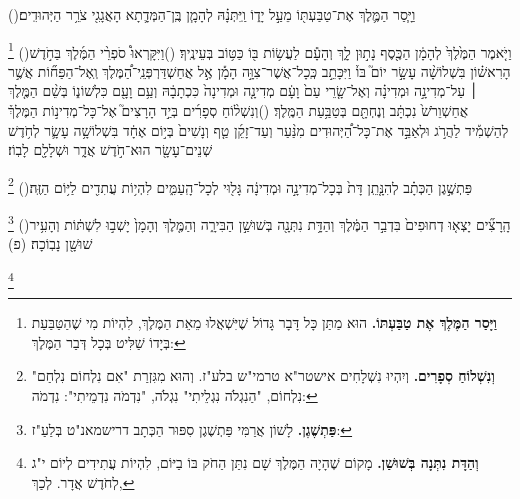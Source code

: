 \documentclass[12pt, openany]{book}
\newcommand{\footnotecomment}[1]{
	\renewcommand\thefootnote{}
	\footnote{\textsf{#1}}}
\newcommand{\commenta}[1]{\footnotecomment{#1}\hspace{0em}}
\newcommand{\vsnum}[1]{(\hebrewnumeral{#1})\space}
\begin{document}
\begin{multicols}{2}
\vsnum{10}וַיָּ֧סַר הַמֶּ֛לֶךְ אֶת־טַבַּעְתּ֖וֹ מֵעַ֣ל יָד֑וֹ וַֽיִּתְּנָ֗הּ לְהָמָ֧ן בֶּֽן־הַמְּדָ֛תָא הָאֲגָגִ֖י צֹרֵ֥ר הַיְּהוּדִֽים׃%
\commenta{\textrm{\textbf{וַיָּסַר הַמֶּלֶךְ אֶת טַבַּעְתּוֹ.}} הוּא מַתַּן כָּל דָּבָר גָּדוֹל שֶׁיִּשְׁאֲלוּ מֵאֵת הַמֶּלֶךְ, לִהְיוֹת מִי שֶׁהַטַּבַּעַת בְּיָדוֹ שַׁלִּיט בְּכָל דְּבַר הַמֶּלֶךְ: }%
\vsnum{11}וַיֹּ֤אמֶר הַמֶּ֙לֶךְ֙ לְהָמָ֔ן הַכֶּ֖סֶף נָת֣וּן לָ֑ךְ וְהָעָ֕ם לַעֲשׂ֥וֹת בּ֖וֹ כַּטּ֥וֹב בְּעֵינֶֽיךָ׃
\vsnum{12}וַיִּקָּרְאוּ֩ סֹפְרֵ֨י הַמֶּ֜לֶךְ בַּחֹ֣דֶשׁ הָרִאשׁ֗וֹן בִּשְׁלוֹשָׁ֨ה עָשָׂ֣ר יוֹם֮ בּוֹ֒ וַיִּכָּתֵ֣ב כְּֽכָל־אֲשֶׁר־צִוָּ֣ה הָמָ֡ן אֶ֣ל אֲחַשְׁדַּרְפְּנֵֽי־הַ֠מֶּלֶךְ וְֽאֶל־הַפַּח֞וֹת אֲשֶׁ֣ר ׀ עַל־מְדִינָ֣ה וּמְדִינָ֗ה וְאֶל־שָׂ֤רֵי עַם֙ וָעָ֔ם מְדִינָ֤ה וּמְדִינָה֙ כִּכְתָבָ֔הּ וְעַ֥ם וָעָ֖ם כִּלְשׁוֹנ֑וֹ בְּשֵׁ֨ם הַמֶּ֤לֶךְ אֲחַשְׁוֵרֹשׁ֙ נִכְתָּ֔ב וְנֶחְתָּ֖ם בְּטַבַּ֥עַת הַמֶּֽלֶךְ׃
\vsnum{13}וְנִשְׁל֨וֹחַ סְפָרִ֜ים בְּיַ֣ד הָרָצִים֮ אֶל־כָּל־מְדִינ֣וֹת הַמֶּלֶךְ֒ לְהַשְׁמִ֡יד לַהֲרֹ֣ג וּלְאַבֵּ֣ד אֶת־כָּל־הַ֠יְּהוּדִים מִנַּ֨עַר וְעַד־זָקֵ֜ן טַ֤ף וְנָשִׁים֙ בְּי֣וֹם אֶחָ֔ד בִּשְׁלוֹשָׁ֥ה עָשָׂ֛ר לְחֹ֥דֶשׁ שְׁנֵים־עָשָׂ֖ר הוּא־חֹ֣דֶשׁ אֲדָ֑ר וּשְׁלָלָ֖ם לָבֽוֹז׃%
\commenta{\textrm{\textbf{וְנִשְׁלוֹחַ סְפָרִים.}} וְיִהְיוּ נִשְׁלָחִים אישטר"א טרמי"ש בלע"ז. וְהוּא מִגִּזְרַת "אִם נִלְחוֹם נִלְחַם" נִלְחוֹם, "הַנִגְלֹה נִגְלֵיתִי" נִגְלֹה, "נִדְמֹה נִדְמֵיתִי": נִדְמֹה: }%
\vsnum{14}פַּתְשֶׁ֣גֶן הַכְּתָ֗ב לְהִנָּ֤תֵֽן דָּת֙ בְּכָל־מְדִינָ֣ה וּמְדִינָ֔ה גָּל֖וּי לְכָל־הָֽעַמִּ֑ים לִהְי֥וֹת עֲתִדִ֖ים לַיּ֥וֹם הַזֶּֽה׃%
\commenta{\textrm{\textbf{פַּתְשֶׁגֶן.}} לָשׁוֹן אֲרַמִּי פַּתְשֶׁגֶן סִפּוּר הַכְּתָב דרישמאנ"ט בְּלַעַ"ז: }%
\vsnum{15}הָֽרָצִ֞ים יָצְא֤וּ דְחוּפִים֙ בִּדְבַ֣ר הַמֶּ֔לֶךְ וְהַדָּ֥ת נִתְּנָ֖ה בְּשׁוּשַׁ֣ן הַבִּירָ֑ה וְהַמֶּ֤לֶךְ וְהָמָן֙ יָשְׁב֣וּ לִשְׁתּ֔וֹת וְהָעִ֥יר שׁוּשָׁ֖ן נָבֽוֹכָה׃ (פ)%
\commenta{\textrm{\textbf{וְהַדָּת נִתְּנָה בְּשׁוּשַׁן.}} מָקוֹם שֶׁהָיָה הַמֶּלֶךְ שָׁם נִתַּן הַחֹק בּוֹ בַיּוֹם, לִהְיוֹת עֲתִידִים לְיוֹם י"ג לְחֹדֶשׁ אֲדָר. לְכַךְ, }%
\end{multicols}\newpage
\end{document}
